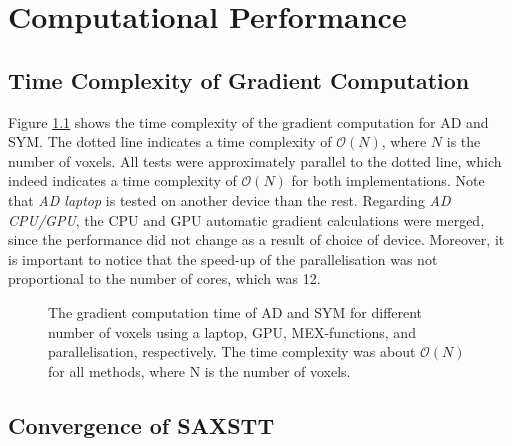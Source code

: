 \chapter{Computational Performance}



\section{Time Complexity of Gradient Computation}

Figure \ref{fig:gradient_time_complexity} shows the time complexity of the gradient computation for AD and SYM.
The dotted line indicates a time complexity of $\mathcal{O}(N)$, where $N$ is the number of voxels.
All tests were approximately parallel to the dotted line, which indeed indicates a time complexity of $\mathcal{O}(N)$ for both implementations.
Note that \emph{AD laptop} is tested on another device than the rest.
Regarding \emph{AD CPU/GPU}, the CPU and GPU automatic gradient calculations were merged, since the performance did not change as a result of choice of device. %
Moreover, it is important to notice that the speed-up of the parallelisation was not proportional to the number of cores, which was 12.
\begin{figure}[h!]
    \centering
    
    \caption{ The gradient computation time of AD and SYM for different number of voxels using a laptop, GPU, MEX-functions, and parallelisation, respectively. %
        The time complexity was about $\mathcal{O}(N)$ for all methods, where N is the number of voxels.}
    \label{fig:gradient_time_complexity}
\end{figure}

\clearpage
\section{Convergence of SAXSTT}

